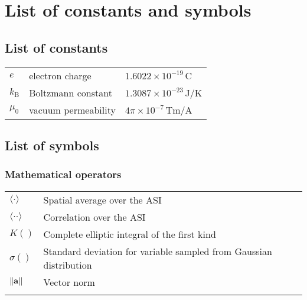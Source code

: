\chapter{List of constants and symbols}  %
\section*{List of constants}
\begin{longtable}[l]{p{60pt} p{150pt} p{200pt}}
	$e$&electron charge&$1.6022\times 10^{-19}$\,C\\
	$k_\mathrm{B}$&Boltzmann constant&$1.3087\times 10^{-23}$\,J/K\\
	$\mu_0$&vacuum permeability&$4\pi\times 10^{-7}$\,Tm/A\\
\end{longtable}

\section*{List of symbols}
\subsection*{Mathematical operators}
\begin{longtable}[l]{p{60pt} p{350pt}}
	$\langle \cdot \rangle$ & Spatial average over the ASI \\
	$\langle \cdot \cdot \rangle$ & Correlation over the ASI \\
	$K()$ & Complete elliptic integral of the first kind \\
	$\sigma()$ & Standard deviation for variable sampled from Gaussian distribution \\
	$\norm{\boldsymbol{\mathbf{a}}}$ & Vector norm\\
	&\\
\end{longtable}

